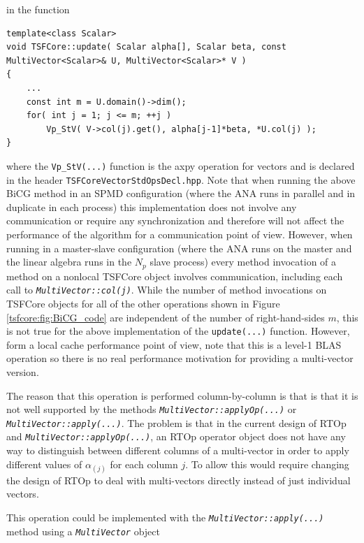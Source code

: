 in the function

{\tiny\begin{verbatim}
template<class Scalar>
void TSFCore::update( Scalar alpha[], Scalar beta, const MultiVector<Scalar>& U, MultiVector<Scalar>* V )
{
    ...
    const int m = U.domain()->dim();
    for( int j = 1; j <= m; ++j )
        Vp_StV( V->col(j).get(), alpha[j-1]*beta, *U.col(j) );
}
\end{verbatim}}

where the \texttt{Vp\_StV(...)} function is the axpy operation for
vectors and is declared in the header
\texttt{TSFCore\-Vector\-StdOps\-Decl.hpp}.  Note that when running the
above BiCG method in an SPMD configuration (where the ANA runs in
parallel and in duplicate in each process) this implementation does
not involve any communication or require any synchronization and
therefore will not affect the performance of the algorithm for a
communication point of view.  However, when running in a master-slave
configuration (where the ANA runs on the master and the linear algebra
runs in the $N_p$ slave process) every method invocation of a method
on a nonlocal TSFCore object involves communication, including each
call to
\texttt{\textit{Multi\-Vector\-::col(j)}}.  While the number of method
invocations on TSFCore objects for all of the other operations shown in
Figure \ref{tsfcore:fig:BiCG_code} are independent of the number of
right-hand-sides $m$, this is not true for the above implementation of
the \texttt{update(...)} function.  However, form a local cache
performance point of view, note that this is a level-1 BLAS operation
so there is no real performance motivation for providing a
multi-vector version.

The reason that this operation is performed column-by-column is that
is that it is not well supported by the methods
\texttt{\textit{Multi\-Vector\-::applyOp(\-...)}} or
\texttt{\textit{Multi\-Vector\-::apply(\-...)}}.  The problem is that in
the current design of RTOp and
\texttt{\textit{Multi\-Vector\-::applyOp(\-...)}}, an RTOp operator object
does not have any way to distinguish between different columns of a
multi-vector in order to apply different values of $\alpha_{(j)}$ for
each column $j$.  To allow this would require changing the design of
RTOp to deal with multi-vectors directly instead of just individual
vectors.

This operation could be implemented with the
\texttt{\textit{Multi\-Vector\-::apply(\-...)}} method using a
\texttt{\textit{Multi\-Vector}} object

